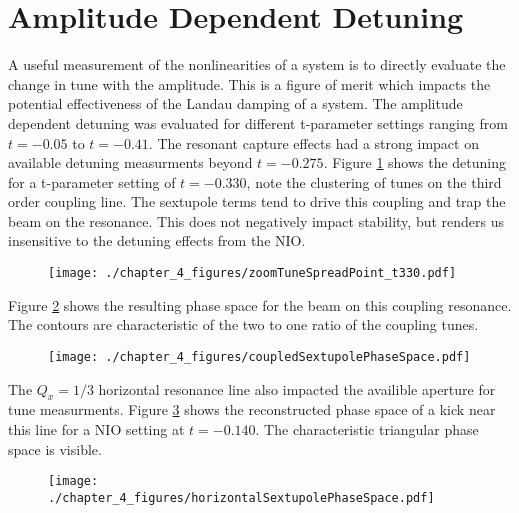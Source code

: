 \section{Amplitude Dependent Detuning} \label{sec:ampDetune}
A useful measurement of the nonlinearities of a system is to directly evaluate the change in tune with the amplitude. This is a figure of merit which impacts the potential effectiveness of the Landau damping of a system. The amplitude dependent detuning was evaluated for different t-parameter settings ranging from $t=-0.05$ to $t=-0.41$. The resonant capture effects had a strong impact on available detuning measurments beyond $t=-0.275$. Figure \ref{fig:t330Detuning} shows the detuning for a t-parameter setting of $t=-0.330$, note the clustering of tunes on the third order coupling line. The sextupole terms tend to drive this coupling and trap the beam on the resonance. This does not negatively impact stability, but renders us insensitive to the detuning effects from the NIO.

\begin{figure}
	\centering
	\texttt{[image: ./chapter\_4\_figures/zoomTuneSpreadPoint\_t330.pdf]}
	\caption{}
	\label{fig:t330Detuning}
\end{figure}


Figure \ref{fig:t330phaseSpace} shows the resulting phase space for the beam on this coupling resonance. The contours are characteristic of the two to one ratio of the coupling tunes.

\begin{figure}
	\centering
	\texttt{[image: ./chapter\_4\_figures/coupledSextupolePhaseSpace.pdf]}
	\caption{}
	\label{fig:t330phaseSpace}
\end{figure}

The $Q_x = 1/3$ horizontal resonance line also impacted the availible aperture for tune measurments. Figure \ref{fig:t140phaseSpace} shows the reconstructed phase space of a kick near this line for a NIO setting at $t=-0.140$. The characteristic triangular phase space is visible.

\begin{figure}
	\centering
	\texttt{[image: ./chapter\_4\_figures/horizontalSextupolePhaseSpace.pdf]}
	\caption{}
	\label{fig:t140phaseSpace}
\end{figure}


